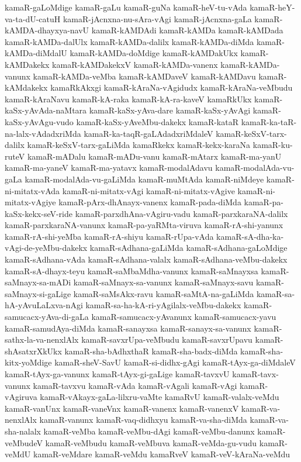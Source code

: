 {kamaR-gaLoMdige
kamaR-gaLu
kamaR-guNa
kamaR-heV-tu-vAda
kamaR-heY-va-ta-dU-catuH
kamaR-jAcnxna-nu-sAra-vAgi
kamaR-jAcnxna-gaLa
kamaR-kAMDA-dhayxya-navU
kamaR-kAMDAdi
kamaR-kAMDa
kamaR-kAMDada
kamaR-kAMDa-dalUlx
kamaR-kAMDa-dalilx
kamaR-kAMDa-diMda
kamaR-kAMDa-diMdalU
kamaR-kAMDa-doMdige
kamaR-kAMDakUkx
kamaR-kAMDakekx
kamaR-kAMDakekxV
kamaR-kAMDa-vanenx
kamaR-kAMDa-vanunx
kamaR-kAMDa-veMba
kamaR-kAMDaveV
kamaR-kAMDavu
kamaR-kAMdakekx
kamaRkAkxgi
kamaR-kAraNa-vAgidudx
kamaR-kAraNa-veMbudu
kamaR-kAraNavu
kamaR-kA-raka
kamaR-kA-ra-kaveV
kamaRkUkx
kamaR-kaSx-yAvAda-naMtara
kamaR-kaSx-yAva-dare
kamaR-kaSx-yAvAgi
kamaR-kaSx-yAvAgu-vudo
kamaR-kaSx-yAveMbu-dakekx
kamaR-kataR
kamaR-ka-taR-na-lalx-vAdadxriMda
kamaR-ka-taqR-gaLAdadxriMdaleV
kamaR-keSxV-tarx-dalilx
kamaR-keSxV-tarx-gaLiMda
kamaRkekx
kamaR-kekx-karaNa
kamaR-ku-ruteV
kamaR-mADalu
kamaR-mADu-vanu
kamaR-mAtarx
kamaR-ma-yanU
kamaR-ma-yaneV
kamaR-ma-yatavx
kamaR-modalAdavu
kamaR-modalAda-vu-gaLa
kamaR-modalAda-vu-gaLiMda
kamaR-muMtAda
kamaR-niMdeye
kamaR-ni-mitatx-vAda
kamaR-ni-mitatx-vAgi
kamaR-ni-mitatx-vAgive
kamaR-ni-mitatx-vAgiye
kamaR-pArx-dhAnayx-vanenx
kamaR-pada-diMda
kamaR-pa-kaSx-kekx-seV-ride
kamaR-parxdhAna-vAgiru-vadu
kamaR-parxkaraNA-dalilx
kamaR-parxkaraNA-vanunx
kamaR-pa-yaRMta-viruva
kamaR-rA-shi-yanunx
kamaR-rA-shi-yeMba
kamaR-rA-shiyu
kamaR-rUpa-vAda
kamaR-sA-dha-ka-vAgi-de-yeMbu-dakekx
kamaR-sAdhana-gaLiMda
kamaR-sAdhana-gaLoMdige
kamaR-sAdhana-vAda
kamaR-sAdhana-valalx
kamaR-sAdhana-veMbu-dakekx
kamaR-sA-dhayx-teyu
kamaR-saMbaMdha-vanunx
kamaR-saMnayxsa
kamaR-saMnayx-sa-mADi
kamaR-saMnayx-sa-vanunx
kamaR-saMnayx-savu
kamaR-saMnayx-si-gaLige
kamaR-saMsAkx-ravu
kamaR-saMtA-na-gaLiMda
kamaR-sa-hA-yAvuLaLxva-nAgi
kamaR-sa-ha-kA-ri-yAgilalx-veMbu-dakekx
kamaR-samucacx-yAva-di-gaLa
kamaR-samucacx-yAvanunx
kamaR-samucacx-yavu
kamaR-samudAya-diMda
kamaR-sanayxsa
kamaR-sanayx-sa-vanunx
kamaR-sathx-la-va-nenxlAlx
kamaR-savxrUpa-veMbudu
kamaR-savxrUpavu
kamaR-shAsatxrXkUkx
kamaR-sha-bAdhxthaR
kamaR-sha-badx-diMda
kamaR-sha-kitx-yoMdige
kamaR-sheV-SavU
kamaR-si-didhx-gAgi
kamaR-tAyx-ga-diMdaleV
kamaR-tAyx-ga-vanunx
kamaR-tAyx-gi-gaLige
kamaR-tavxvU
kamaR-tavx-vanunx
kamaR-tavxvu
kamaR-vAda
kamaR-vAgali
kamaR-vAgi
kamaR-vAgiruva
kamaR-vAkayx-gaLa-lilxru-vaMte
kamaRvU
kamaR-valalx-veMdu
kamaR-vanUnx
kamaR-vaneVnx
kamaR-vanenx
kamaR-vanenxV
kamaR-va-nenxlAlx
kamaR-vanunx
kamaR-vaq-didhxyu
kamaR-va-sha-diMda
kamaR-va-sha-nalalx
kamaR-veMba
kamaR-veMbu-dAgi
kamaR-veMbu-danunx
kamaR-veMbudeV
kamaR-veMbudu
kamaR-veMbuva
kamaR-veMda-gu-vudu
kamaR-veMdU
kamaR-veMdare
kamaR-veMdu
kamaRveV
kamaR-veV-kAraNa-veMdu
}
